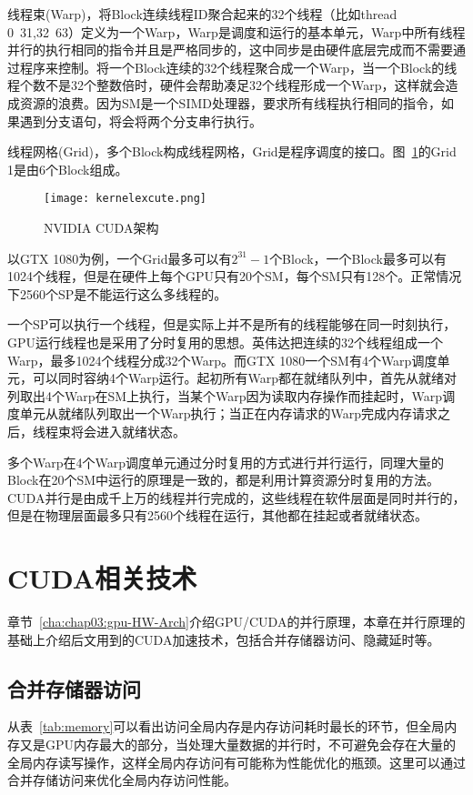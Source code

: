 线程束(Warp)，将Block连续线程ID聚合起来的32个线程（比如thread 0~31,32~63）定义为一个Warp，Warp是调度和运行的基本单元，Warp中所有线程并行的执行相同的指令并且是严格同步的，这中同步是由硬件底层完成而不需要通过程序来控制。将一个Block连续的32个线程聚合成一个Warp，当一个Block的线程个数不是32个整数倍时，硬件会帮助凑足32个线程形成一个Warp，这样就会造成资源的浪费。因为SM是一个SIMD处理器，要求所有线程执行相同的指令，如果遇到分支语句，将会将两个分支串行执行。

线程网格(Grid)，多个Block构成线程网格，Grid是程序调度的接口。图~\ref{fig:nvidia-cuda-arch}的Grid 1是由6个Block组成。

\begin{figure}[H] %
	\centering
	\texttt{[image: kernelexcute.png]}
	\caption{NVIDIA CUDA架构}
	\label{fig:nvidia-cuda-arch}
\end{figure}

以GTX 1080为例，一个Grid最多可以有$2^{31}-1$个Block，一个Block最多可以有1024个线程，但是在硬件上每个GPU只有20个SM，每个SM只有128个。正常情况下2560个SP是不能运行这么多线程的。

一个SP可以执行一个线程，但是实际上并不是所有的线程能够在同一时刻执行，GPU运行线程也是采用了分时复用的思想。英伟达把连续的32个线程组成一个Warp，最多1024个线程分成32个Warp。而GTX 1080一个SM有4个Warp调度单元，可以同时容纳4个Warp运行。起初所有Warp都在就绪队列中，首先从就绪对列取出4个Warp在SM上执行，当某个Warp因为读取内存操作而挂起时，Warp调度单元从就绪队列取出一个Warp执行；当正在内存请求的Warp完成内存请求之后，线程束将会进入就绪状态。

多个Warp在4个Warp调度单元通过分时复用的方式进行并行运行，同理大量的Block在20个SM中运行的原理是一致的，都是利用计算资源分时复用的方法。CUDA并行是由成千上万的线程并行完成的，这些线程在软件层面是同时并行的，但是在物理层面最多只有2560个线程在运行，其他都在挂起或者就绪状态。

\section{CUDA相关技术}
章节~\ref{cha:chap03:gpu-HW-Arch}介绍GPU/CUDA的并行原理，本章在并行原理的基础上介绍后文用到的CUDA加速技术，包括合并存储器访问、隐藏延时等。

\subsection{合并存储器访问}

从表~\ref{tab:memory}可以看出访问全局内存是内存访问耗时最长的环节，但全局内存又是GPU内存最大的部分，当处理大量数据的并行时，不可避免会存在大量的全局内存读写操作，这样全局内存访问有可能称为性能优化的瓶颈。这里可以通过合并存储访问来优化全局内存访问性能。

